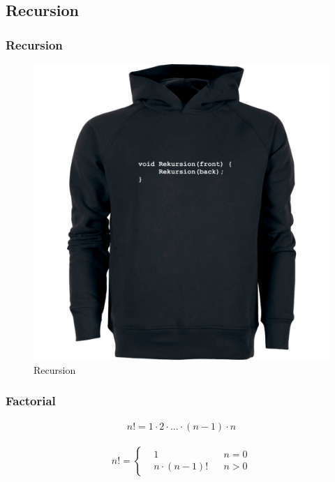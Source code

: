 \subsection{Recursion}

\begin{frame}[fragile]
\frametitle{Recursion}
\begin{figure}[h]
\centering\includegraphics[scale=0.15]{img/recursion.jpg}
\caption{Recursion}
\end{figure}
\end{frame}

\begin{frame}[fragile]
\frametitle{Factorial}

\begin{definition}[Factorial]
\begin{align}
n! = 1 \cdot 2 \cdot ... \cdot (n-1) \cdot n
\end{align}
\end{definition}

\begin{definition}
\begin{align}
n!=\left\{\begin{aligned} & 1 & & n=0\\
& n \cdot (n-1)! & & n>0 \end{aligned}\right.
\end{align}
\end{definition}
\end{frame}

